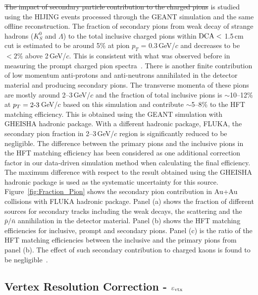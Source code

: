 \documentclass[%
 reprint,	
showpacs,
 amsmath,amssymb,
 aps,
 prc,
]{revtex4-1}
\providecommand{\DIFaddtex}[1]{{\protect\color{blue}\uwave{#1}}} %
\providecommand{\DIFdeltex}[1]{{\protect\color{red}\sout{#1}}}                      %
\providecommand{\DIFaddbegin}{} %
\providecommand{\DIFaddend}{} %
\providecommand{\DIFdelend}{} %
\providecommand{\DIFadd}[1]{\texorpdfstring{\DIFaddtex{#1}}{#1}} %
\providecommand{\DIFdel}[1]{\texorpdfstring{\DIFdeltex{#1}}{}} %
\begin{document}
\DIFdel{The impact of secondary particle contribution to the charged pions }\DIFdelend \DIFaddbegin \DIFadd{inclusive pion distributions }\DIFaddend is studied using the HIJING events processed through the GEANT simulation and the same offline reconstruction. The fraction of secondary pions from weak decay of strange hadrons ($K^0_S$ and $\Lambda$) to the total inclusive charged pions within ${\rm DCA}<$ 1.5\,cm cut is estimated to be around 5\% at pion $p_{T}$ = 0.3\,GeV/$c$ and decreases to be $<2\%$ above 2\,GeV/$c$. This is consistent with what was observed before in measuring the prompt charged pion spectra~\cite{Adams:2003xp}. There is another finite contribution of low momentum anti-protons and anti-neutrons annihilated in the detector material and producing secondary pions. The transverse momenta of these pions are mostly around 2--3\,GeV/$c$ and the fraction of total inclusive pions is $\sim$\DIFaddbegin \DIFadd{\,}\DIFaddend 10--12\% at $p_{T} =2\textup{-}3$\,GeV/$c$ based on this simulation and contribute $\sim$\DIFaddbegin \DIFadd{\,}\DIFaddend 5--8\% to the HFT matching efficiency. This is obtained using the GEANT simulation with GHEISHA hadronic package. With a different hadronic package, FLUKA, the secondary pion fraction in 2--3\,GeV/$c$ region is significantly reduced to be negligible. The difference between the primary pions and the inclusive pions in the HFT matching efficiency has been considered as one additional correction factor in our data-driven simulation method when calculating the final efficiency. The maximum difference with respect to the result obtained using the GHEISHA hadronic package is used as the systematic uncertainty for this source. Figure~\ref{fig:Fraction_Pion} shows the secondary pion contribution in Au+Au collisions with FLUKA hadronic package. Panel (a) shows the fraction of different sources for secondary tracks including the weak decays, the scattering and the $\bar{p}/\bar{n}$ annihilation in the detector material. Panel (b) shows the HFT matching efficiencies for inclusive, prompt and secondary pions. Panel (c) is the ratio of the HFT matching efficiencies between the inclusive and the primary pions from panel (b). The effect of such secondary contribution to charged kaons is found to be negligible~\cite{Adams:2003xp}.

\subsection{Vertex Resolution Correction - $\varepsilon_{\rm vtx}$}
\label{correction:vtx}
\end{document}
